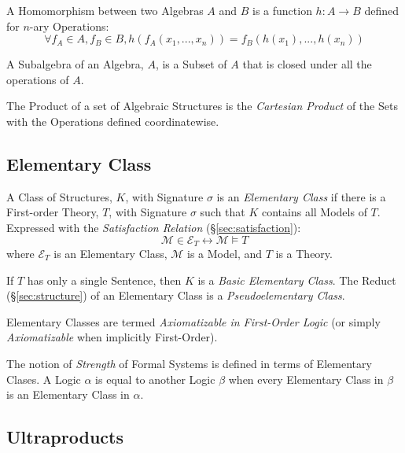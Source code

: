A Homomorphism between two Algebras $A$ and $B$ is a function $h: A
\rightarrow B$ defined for $n$-ary Operations:
\[
\forall f_A \in A, f_B \in B, h(f_A(x_1, ..., x_n)) = f_B(h(x_1), ...,
h(x_n))
\]

A Subalgebra of an Algebra, $A$, is a Subset of $A$ that is closed
under all the operations of $A$.

The Product of a set of Algebraic Structures is the \emph{Cartesian
  Product} of the Sets with the Operations defined coordinatewise.

\subsection{Elementary Class}\label{sec:elementary_class}

A Class of Structures, $K$, with Signature $\sigma$ is an
\emph{Elementary Class} if there is a First-order Theory, $T$, with
Signature $\sigma$ such that $K$ contains all Models of $T$.
Expressed with the \emph{Satisfaction Relation}
(\S\ref{sec:satisfaction}):
\[
    \mathcal{M} \in \mathcal{E}_T \leftrightarrow \mathcal{M} \vDash T
\]
where $\mathcal{E}_T$ is an Elementary Class, $\mathcal{M}$ is a
Model, and $T$ is a Theory.

If $T$ has only a single Sentence, then $K$ is a \emph{Basic
  Elementary Class}. The Reduct (\S\ref{sec:structure}) of an
Elementary Class is a \emph{Pseudoelementary Class}.

Elementary Classes are termed \emph{Axiomatizable in First-Order
  Logic} (or simply \emph{Axiomatizable} when implicitly First-Order).

The notion of \emph{Strength} of Formal Systems is defined in terms of
Elementary Clases. A Logic $\alpha$ is equal to another Logic $\beta$
when every Elementary Class in $\beta$ is an Elementary Class in
$\alpha$.

\subsection{Ultraproducts}\label{sec:ultraproducts}



